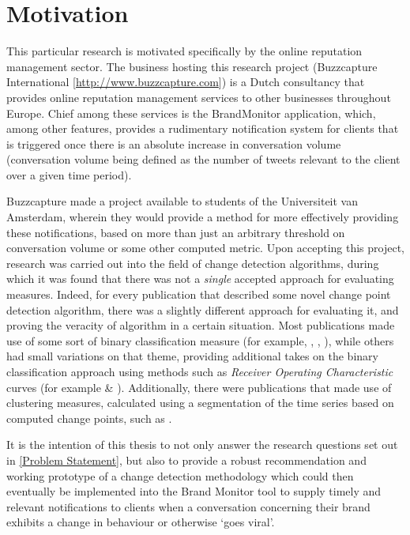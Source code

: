 \documentclass{uvamscse}	%
\begin{document}

\section{Motivation}

This particular research is motivated specifically by the online reputation management sector. The business hosting this research project (Buzzcapture International [\url{http://www.buzzcapture.com}]) is a Dutch consultancy that provides online reputation management services to other businesses throughout Europe. Chief among these services is the BrandMonitor application, which, among other features, provides a rudimentary notification system for clients that is triggered once there is an absolute increase in conversation volume (conversation volume being defined as the number of tweets relevant to the client over a given time period).

Buzzcapture made a project available to students of the Universiteit van Amsterdam, wherein they would provide a method for more effectively providing these notifications, based on more than just an arbitrary threshold on conversation volume or some other computed metric. Upon accepting this project, research was carried out into the field of change detection algorithms, during which it was found that there was not a \emph{single} accepted approach for evaluating measures. Indeed, for every publication that described some novel change point detection algorithm, there was a slightly different approach for evaluating it, and proving the veracity of algorithm in a certain situation. Most publications made use of some sort of binary classification measure (for example, \cite{Qahtan2015}, \cite{Buntain2014}, \cite{Pelecanos2010}), while others had small variations on that theme, providing additional takes on the binary classification approach using methods such as \emph{Receiver Operating Characteristic} curves (for example \cite{Fawcett1999} \& \cite{Desobry2005}). Additionally, there were publications that made use of clustering measures, calculated using a segmentation of the time series based on computed change points, such as \cite{Matteson2012}.

It is the intention of this thesis to not only answer the research questions set out in \autoref{Problem Statement}, but also to provide a robust recommendation and working prototype of a change detection methodology which could then eventually be implemented into the Brand Monitor tool to supply timely and relevant notifications to clients when a conversation concerning their brand exhibits a change in behaviour or otherwise `goes viral'.
\end{document}
